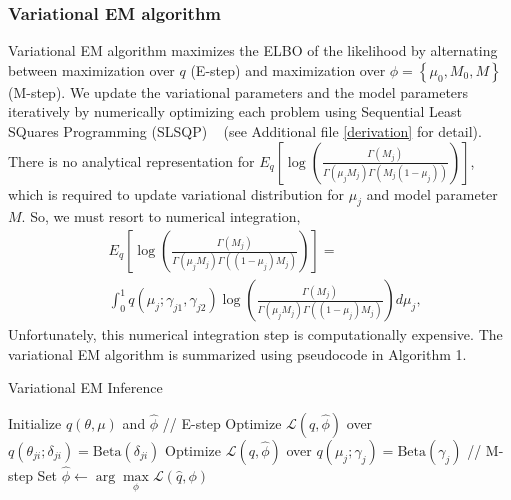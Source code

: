 \documentclass{bmcart}
\begin{document}
\subsubsection{Variational EM algorithm}
Variational EM algorithm maximizes the ELBO of the likelihood by alternating between maximization over $q$ (E-step) and maximization over $\phi= \left\{\mu_0, M_0, M \right\}$ (M-step).
We update the variational parameters and the model parameters iteratively by numerically optimizing each problem using Sequential Least SQuares Programming (SLSQP) ~\cite{kraft1988software} (see Additional file \ref{derivation} for detail).
There is no analytical representation for 
$E_q\left[ \log \left( \frac{ \Gamma(M_j) } { \Gamma(\mu_j M_j) \Gamma(M_j (1-\mu_j)) }\right)\right]$,
which is required to update variational distribution for $\mu_j$ and model parameter $M$.
So, we must resort to numerical integration,
\begin{equation}\label{eqn:integration}
\begin{split}
& E_q\left[ \log \left( \frac{ \Gamma(M_j) } { \Gamma(\mu_j M_j) \Gamma((1-\mu_j)M_j ) }\right)\right] =\\
& \int_{0}^{1} q(\mu_j;\gamma_{j1}, \gamma_{j2}) \log \left( \frac{ \Gamma(M_j) } { \Gamma(\mu_j M_j) \Gamma((1-\mu_j)M_j ) }\right) d\mu_j,
\end{split}
\end{equation}
Unfortunately, this numerical integration step is computationally expensive.
The variational EM algorithm is summarized using pseudocode in Algorithm 1.

\begin{algorithm}[ht]
  \caption{Variational EM Inference}
  \begin{algorithmic}[1]
  \State Initialize $q(\theta, \mu)$ and $\hat{\phi}$
  \Repeat
    \State // E-step
	\Repeat
			\State Optimize $\mathcal{L}(q, \hat{\phi})$ over $q(\theta_{ji}; \delta_{ji}) = \text{Beta} (\delta_{ji})$
			\EndFor
		\EndFor
            \State Optimize $\mathcal{L}(q, \hat{\phi})$ over $q(\mu_j; \gamma_j) = \text{Beta} (\gamma_j)$
        \EndFor
    \State // M-step
    \State Set $\hat{\phi} \leftarrow \arg \max\limits_{\phi}
            \mathcal{L}(\hat{q},\phi)$
  \end{algorithmic}
\end{algorithm}
\end{document}
